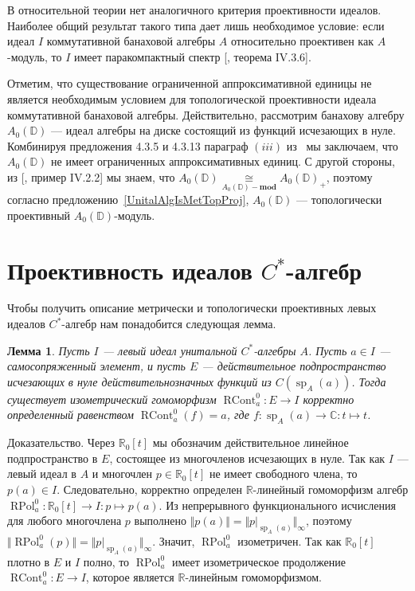 \documentclass[12pt]{article}
\numberwithin{equation}{subsection}
\theoremstyle{plain}
\newtheorem{lemma}{Лемма}
\newenvironment{proof}{Доказательство.}{}
\newcommand{\isom}[1]{\mathop{\mathbin{\cong}}\limits_{#1}}
\begin{document}
\begin{fulltext}
В относительной теории нет аналогичного критерия проективности идеалов. Наиболее
общий результат такого типа дает лишь необходимое условие: если идеал $I$
коммутативной банаховой алгебры $A$ относительно проективен как $A$-модуль, то
$I$ имеет паракомпактный спектр [\cite{HelHomolBanTopAlg}, теорема IV.3.6]. 

Отметим, что существование ограниченной аппроксимативной единицы не является
необходимым условием для топологической проективности идеала коммутативной
банаховой алгебры. Действительно, рассмотрим банахову алгебру  $A_0(\mathbb{D})$
--- идеал алгебры на диске состоящий из функций исчезающих в нуле. Комбинируя
предложения 4.3.5 и 4.3.13 параграф $(iii)$ из~\cite{DalBanAlgAutCont} мы
заключаем, что $A_0(\mathbb{D})$ не имеет ограниченных аппроксимативных единиц.
С другой стороны, из [\cite{HelBanLocConvAlg}, пример IV.2.2] мы знаем, что
$A_0(\mathbb{D})\isom{A_0(\mathbb{D})-\mathbf{mod}} {A_0(\mathbb{D})}_+$, поэтому
согласно предложению~\ref{UnitalAlgIsMetTopProj}, $A_0(\mathbb{D})$ ---
топологически проективный $A_0(\mathbb{D})$-модуль.


\section{Проективность идеалов $C^*$-алгебр}\label{
    ProjectiveIdealsOfCStarAlgebras
}

Чтобы получить описание метрически и топологически проективных левых идеалов
$C^*$-алгебр нам понадобится следующая лемма.

\begin{lemma}\label{ContFuncCalcOnIdealOfCStarAlg} Пусть $I$ --- левый идеал
унитальной $C^*$-алгебры $A$. Пусть $a\in I$ --- самосопряженный элемент, и
пусть $E$ --- действительное подпространство исчезающих в нуле
действительнозначных функций из $C(\operatorname{sp}_A(a))$. Тогда существует
изометрический гомоморфизм $\operatorname{RCont}_a^0:E\to I$ корректно
определенный равенством $\operatorname{RCont}_a^0(f)=a$, где
$f:\operatorname{sp}_A(a)\to\mathbb{C}:t\mapsto t$.
\end{lemma}
\begin{proof} Через $\mathbb{R}_0[t]$ мы обозначим действительное линейное
подпространство в $E$, состоящее из многочленов исчезающих в нуле. Так как $I$
--- левый идеал в $A$ и многочлен $p\in\mathbb{R}_0[t]$ не имеет свободного
члена, то $p(a)\in I$. Следовательно, корректно определен $\mathbb{R}$-линейный
гомоморфизм алгебр $\operatorname{RPol}_a^0:\mathbb{R}_0[t]\to I:p\mapsto p(a)$.
Из непрерывного функционального исчисления для любого многочлена $p$ выполнено
$\Vert p(a)\Vert=\Vert p|_{\operatorname{sp}_A(a)}\Vert_\infty$, поэтому
$\Vert\operatorname{RPol}_a^0(p)\Vert=\Vert
p|_{\operatorname{sp}_A(a)}\Vert_\infty$. Значит, $\operatorname{RPol}_a^0$
изометричен. Так как $\mathbb{R}_0[t]$ плотно в $E$ и $I$ полно, то
$\operatorname{RPol}_a^0$ имеет изометрическое продолжение
$\operatorname{RCont}_a^0:E\to I$, которое является $\mathbb{R}$-линейным
гомоморфизмом. 
\end{proof}


\end{fulltext}
\end{document}
